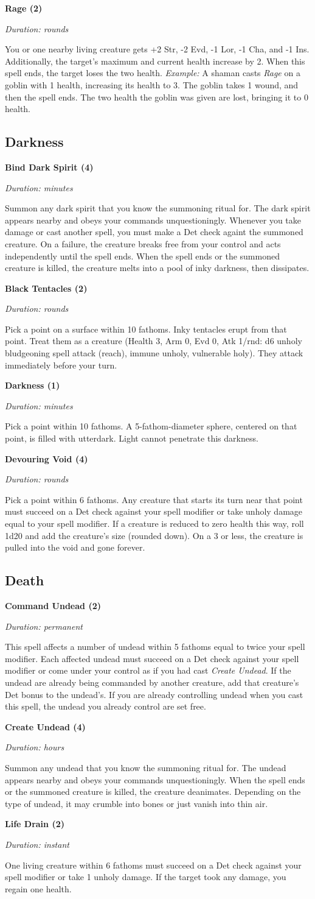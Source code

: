 \documentclass[letterpaper, 12pt, twocolumn]{book}
\def\unnumberedsubsection#1{\subsection*{#1}\addcontentsline{toc}{subsection}{#1}}
\def\example#1{\textit{Example:} #1}
\def\spell#1#2#3#4{\textbf{#1 (#2)}

\textit{Duration: #3}

#4\bigskip}
\def\bind#1#2{Summon any #1 that you know the summoning ritual for. The #1 appears nearby and obeys your commands unquestioningly.
Whenever you take damage or cast another spell, you must make a Det check againt the summoned creature. On a failure, the creature
breaks free from your control and acts independently until the spell ends. When the spell ends or the summoned creature is killed, the
creature #2.}
\def\create#1#2{Summon any #1 that you know the summoning ritual for. The #1 appears nearby and obeys your commands unquestioningly.
When the spell ends or the summoned creature is killed, the creature #2.}
\begin{document}
\spell{Rage}{2}{rounds}{You or one nearby living creature gets +2 Str, -2 Evd, -1 Lor, -1 Cha, and -1 Ins. Additionally, the target's maximum and current health increase by 2. When this spell ends, the target loses the two health.
\newline
\example{A shaman casts \textit{Rage} on a goblin with 1 health, increasing its health to 3. The goblin takes 1 wound, and then the spell
ends. The two health the goblin was given are lost, bringing it to 0 health.}}


\unnumberedsubsection{Darkness}
\spell{Bind Dark Spirit}{4}{minutes}{\bind{dark spirit}{melts into a pool of inky darkness, then dissipates}}

\spell{Black Tentacles}{2}{rounds}{Pick a point on a surface within 10 fathoms. Inky tentacles erupt from that point. Treat them as a creature
(Health 3, Arm 0, Evd 0, Atk 1/rnd: d6 unholy bludgeoning spell attack (reach), immune unholy, vulnerable holy). They attack immediately
before your turn.}

\spell{Darkness}{1}{minutes}{Pick a point within 10 fathoms. A 5-fathom-diameter sphere, centered on that point, is filled with utterdark.
Light cannot penetrate this darkness.}

\spell{Devouring Void}{4}{rounds}{Pick a point within 6 fathoms. Any creature that starts its turn near that point must succeed on a Det
check against your spell modifier or take unholy damage equal to your spell modifier. If a creature is reduced to zero health this way,
roll 1d20 and add the creature's size (rounded down). On a 3 or less, the creature is pulled into the void and gone forever.}


\unnumberedsubsection{Death}
\spell{Command Undead}{2}{permanent}{This spell affects a number of undead within 5 fathoms equal to twice your spell modifier. Each affected
undead must succeed on a Det check against your spell modifier or come under your control as if you had cast \textit{Create Undead}. If
the undead are already being commanded by another creature, add that creature's Det bonus to the undead's. If you are already controlling
undead when you cast this spell, the undead you already control are set free.}

\spell{Create Undead}{4}{hours}{\create{undead}{deanimates. Depending on the type of undead, it may crumble into bones or just vanish into thin air}}

\spell{Life Drain}{2}{instant}{One living creature within 6 fathoms must succeed on a Det check against your spell modifier or take 1 unholy
damage. If the target took any damage, you regain one health.}
\end{document}
